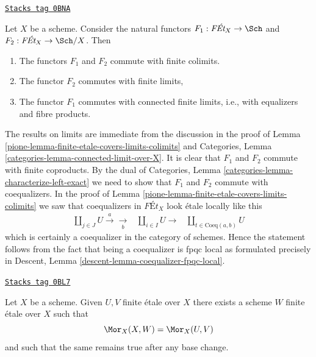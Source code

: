 \begin{remark}
\label{pione-remark-colimits-commute-forgetful}
\href{https://stacks.math.columbia.edu/tag/0BNA}{\texttt{Stacks tag 0BNA}}

Let $X$ be a scheme. Consider the natural functors
$F_1 : \textit{F\'Et}_X \to \Sch$ and $F_2 : \textit{F\'Et}_X \to \Sch/X$.
Then
\begin{enumerate}
\item The functors $F_1$ and $F_2$ commute with finite colimits.
\item The functor $F_2$ commutes with finite limits,
\item The functor $F_1$ commutes with connected finite limits, i.e.,
with equalizers and fibre products.
\end{enumerate}
The results on limits are immediate from the discussion in
the proof of Lemma \ref{pione-lemma-finite-etale-covers-limits-colimits}
and Categories, Lemma \ref{categories-lemma-connected-limit-over-X}.
It is clear that $F_1$ and $F_2$ commute with finite coproducts.
By the dual of Categories, Lemma
\ref{categories-lemma-characterize-left-exact}
we need to show that $F_1$ and $F_2$ commute with coequalizers.
In the proof of Lemma \ref{pione-lemma-finite-etale-covers-limits-colimits}
we saw that coequalizers in $\textit{F\'Et}_X$ look \'etale locally
like this
$$
\begin{array}{ccc}\coprod_{j \in J} U \overset{a}{\longrightarrow}\underset{b}{\longrightarrow} & \coprod_{i \in I} U \longrightarrow & \coprod_{t \in \text{Coeq}(a, b)} U\end{array}
$$
which is certainly a coequalizer in the category of schemes.
Hence the statement follows from the fact that being a coequalizer
is fpqc local as formulated precisely in
Descent, Lemma \ref{descent-lemma-coequalizer-fpqc-local}.
\end{remark}

\begin{lemma}
\label{pione-lemma-internal-hom-finite-etale}
\href{https://stacks.math.columbia.edu/tag/0BL7}{\texttt{Stacks tag 0BL7}}

Let $X$ be a scheme. Given $U, V$ finite \'etale over $X$ there
exists a scheme $W$ finite \'etale over $X$ such that
$$
\Mor_X(X, W) = \Mor_X(U, V)
$$
and such that the same remains true after any base change.
\end{lemma}


